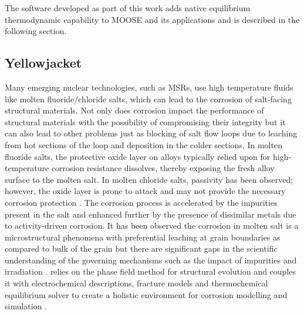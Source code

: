   The software developed as part of this work adds native  equilibrium thermodynamic capability to MOOSE and its applications and is described in the following section.

\subsection{Yellowjacket}
	Many emerging nuclear technologies, such as MSRs, use high temperature fluids like molten fluoride/chloride salts, which can lead to the corrosion of salt-facing structural materials. Not only does corrosion impact the performance of structural materials with the possibility of compromising their integrity but it can also lead to other problems just as blocking of salt flow loops due to leaching from hot sections of the loop and deposition in the colder sections. In molten fluoride salts, the protective oxide layer on alloys typically relied upon for high-temperature corrosion resistance dissolves, thereby exposing the fresh alloy surface to the molten salt. In molten chloride salts, passivity has been observed; however, the oxide layer is prone to attack and may not provide the necessary corrosion protection \cite{Sridharan:2013aa}. The corrosion process is accelerated by the impurities present in the salt and enhanced further by the presence of dissimilar metals due to activity-driven corrosion. It has been observed the corrosion in molten salt is a microstructural phenomena with preferential leaching at grain boundaries as compared to bulk of the grain but there are significant gaps in the scientific understanding of the governing mechanisms such as the impact of impurities and irradiation \cite{Zheng:2018aa,Zhou:2020aa,Zhu:2021aa,Raiman:2018aa,Pillai:2021aa,Guo:2018aa}. {\YJ} relies on the phase field method for structural evolution and couples it with electrochemical descriptions, fracture models and thermochemical equilibrium solver to create a holistic environment for corrosion modelling and simulation \cite{Bhave:2022aa}.

